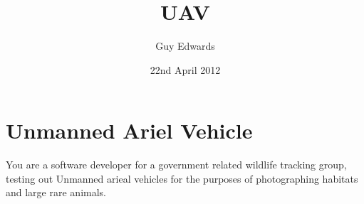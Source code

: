 \documentclass[11pt]{book}
\author{Guy Edwards}
\date{22nd April 2012}
\title{UAV}
\begin{document}

\chapter{Unmanned Ariel Vehicle}

You are a software developer for a government related wildlife tracking group,
testing out Unmanned arieal vehicles for the purposes of photographing
habitats and large rare animals.

\clearpage
\end{document}
